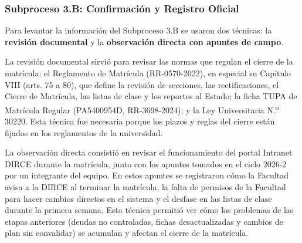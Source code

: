 \subsubsection{Subproceso 3.B: Confirmación y Registro Oficial}

Para levantar la información del Subproceso 3.B se usaron dos técnicas: la \textbf{revisión documental} y la \textbf{observación directa con apuntes de campo}.

La revisión documental sirvió para revisar las normas que regulan el cierre de la matrícula: el Reglamento de Matrícula (RR-0570-2022), en especial su Capítulo VIII (arts. 75\textdegree{} a 80\textdegree{}), que define la revisión de secciones, las rectificaciones, el Cierre de Matrícula, las listas de clase y los reportes al Estado; la ficha TUPA de Matrícula Regular (PA5400954D, RR-3698-2024); y la Ley Universitaria N.\textsuperscript{o} 30220. Esta técnica fue necesaria porque los plazos y reglas del cierre están fijados en los reglamentos de la universidad.

La observación directa consistió en revisar el funcionamiento del portal Intranet DIRCE durante la matrícula, junto con los apuntes tomados en el ciclo 2026-2 por un integrante del equipo. En estos apuntes se registraron cómo la Facultad avisa a la DIRCE al terminar la matrícula, la falta de permisos de la Facultad para hacer cambios directos en el sistema y el desfase en las listas de clase durante la primera semana. Esta técnica permitió ver cómo los problemas de las etapas anteriores (deudas no controladas, fichas desactualizadas y cambios de plan sin convalidar) se acumulan y afectan el cierre de la matrícula.
